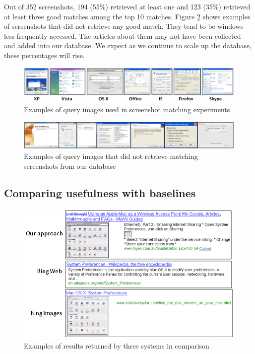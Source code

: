 \documentclass{www2010-submission}
\begin{document}
Out of 352 screenshots, 194 (55\%) retrieved at least one and 123
(35\%) retrieved at least three good matches among the top 10
matches. Figure \ref{fig:hard_examples} shows examples of screenshots
that did not retrieve any good match. They tend to be windows less
frequently accessed. The articles about them may not have been
collected and added into our database.  We expect as we continue to
scale up the database, these percentages will rise.

\begin{figure}
\includegraphics[width=2\columnwidth]{figure/query_examples.png}
\caption{Examples of query images used in screenshot matching
experiments}
\label{fig:query_examples}
\end{figure}

\begin{figure}
\includegraphics[width=2\columnwidth]{figure/hard_examples.png}
\caption{Examples of query images that did not retrieve matching 
screenshots from our database}
\label{fig:hard_examples}
\end{figure}

\subsection{Comparing usefulness with baselines}

\begin{figure}
\includegraphics[width=1\columnwidth]{figure/comparison_example.png}
\caption{Examples of results returned by three systems in comparison}
\label{fig:comparison_example}
\end{figure}
\end{document}
